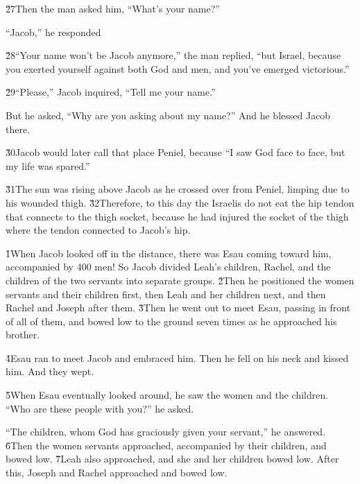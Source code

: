 \v{27}Then the man asked him, ``What's your name?''

``Jacob,'' he responded

\v{28}``Your name won't be Jacob anymore,'' the man replied, ``but Israel, because you exerted yourself against both God and men, and you've emerged victorious.''

\v{29}``Please,'' Jacob inquired, ``Tell me your name.''

But he asked, ``Why are you asking about my name?'' And he blessed Jacob there.

\v{30}Jacob would later call that place Peniel, because ``I saw God face to face, but my life was spared.''

\v{31}The sun was rising above Jacob as he crossed over from Peniel, limping due to his wounded thigh. \v{32}Therefore, to this day the Israelis do not eat the hip tendon that connects to the thigh socket, because he had injured the socket of the thigh where the tendon connected to Jacob's hip.

\v{1}When Jacob looked off in the distance, there was Esau coming toward him, accompanied by 400 men! So Jacob divided Leah's children, Rachel, and the children of the two servants into separate groups. \v{2}Then he positioned the women servants and their children first, then Leah and her children next, and then Rachel and Joseph after them. \v{3}Then he went out to meet Esau, passing in front of all of them, and bowed low to the ground seven times as he approached his brother.

\v{4}Esau ran to meet Jacob and embraced him. Then he fell on his neck and kissed him. And they wept.

\v{5}When Esau eventually looked around, he saw the women and the children. ``Who are these people with you?'' he asked.

``The children, whom God has graciously given your servant,'' he answered. \v{6}Then the women servants approached, accompanied by their children, and bowed low. \v{7}Leah also approached, and she and her children bowed low. After this, Joseph and Rachel approached and bowed low.

